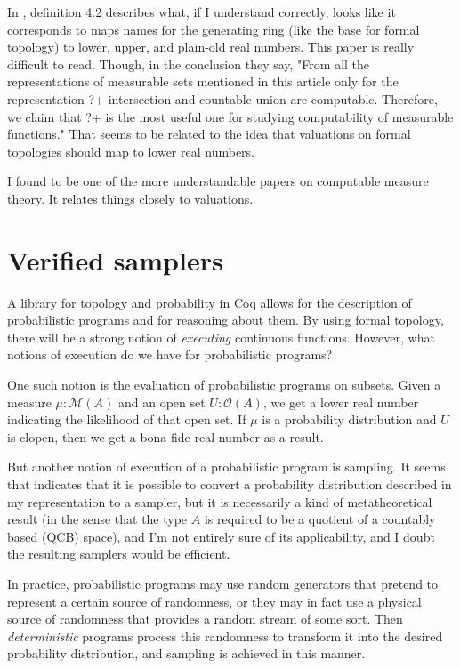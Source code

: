 \documentclass{article}           %
\newcommand{\Dist}[1]{\mathcal{M}({#1})}
\newcommand{\Open}[1]{\mathcal{O}({#1})}
\begin{document}
In \cite{weihrauch2014}, definition 4.2 describes what, if I understand correctly, looks like it corresponds to maps names for the generating ring (like the base for formal topology) to lower, upper, and plain-old real numbers. This paper is really difficult to read. Though, in the conclusion they say, "From all the representations of measurable sets mentioned in this article only for the representation ?+ intersection and countable union are computable. Therefore, we claim that ?+ is the most useful one for studying computability of measurable functions." That seems to be related to the idea that valuations on formal topologies should map to lower real numbers.

I found \cite{collins2014} to be one of the more understandable papers on computable measure theory. It relates things closely to valuations.

\section{Verified samplers}

A library for topology and probability in Coq allows for the description of probabilistic programs and for reasoning about them. By using formal topology, there will be a strong notion of \emph{executing} continuous functions. However, what notions of execution do we have for probabilistic programs?

One such notion is the evaluation of probabilistic programs on subsets. Given a measure $\mu : \Dist{A}$ and an open set $U : \Open{A}$, we get a lower real number indicating the likelihood of that open set. If $\mu$ is a probability distribution and $U$ is clopen, then we get a bona fide real number as a result.

But another notion of execution of a probabilistic program is sampling. It seems that \cite{schroder2007} indicates that it is possible to convert a probability distribution described in my representation to a sampler, but it is necessarily a kind of metatheoretical result (in the sense that the type $A$ is required to be a quotient of a countably based (QCB) space), and I'm not entirely sure of its applicability, and I doubt the resulting samplers would be efficient.

In practice, probabilistic programs may use random generators that pretend to represent a certain source of randomness, or they may in fact use a physical source of randomness that provides a random stream of some sort. Then \emph{deterministic} programs process this randomness to transform it into the desired probability distribution, and sampling is achieved in this manner.
\end{document}
